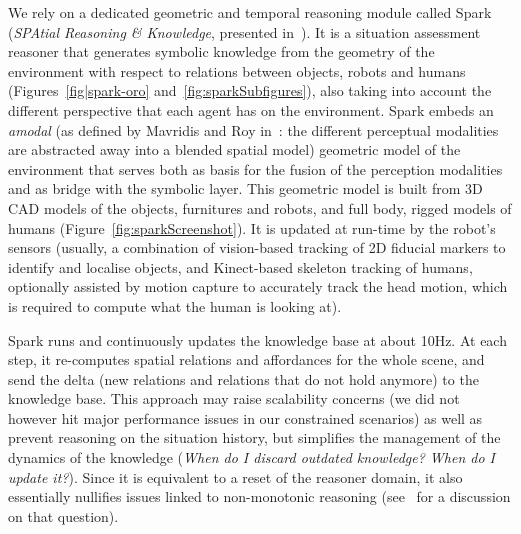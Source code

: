 \documentclass[preprint,3p,times]{elsarticle}
\begin{document}
We rely on a dedicated geometric and temporal reasoning module called {\sc
Spark} (\emph{SPAtial Reasoning \& Knowledge}, presented in~\cite{Sisbot2011}).
It is a situation assessment reasoner that generates symbolic knowledge from the
geometry of the environment with respect to relations between objects, robots
and humans (Figures~\ref{fig|spark-oro} and~\ref{fig:sparkSubfigures}), also
taking into account the different perspective that each agent has on the
environment.  {\sc Spark} embeds an \emph{amodal} (as defined by Mavridis and
Roy in~\cite{Mavridis2006}: the different perceptual modalities are abstracted
away into a blended spatial model) geometric model of the environment that
serves both as basis for the fusion of the perception modalities and as bridge
with the symbolic layer. This geometric model is built from 3D CAD models of the
objects, furnitures and robots, and full body, rigged models of humans
(Figure~\ref{fig:sparkScreenshot}).  It is updated at run-time by the robot's
sensors (usually, a combination of vision-based tracking of 2D fiducial markers
to identify and localise objects, and Kinect-based skeleton tracking of humans,
optionally assisted by motion capture to accurately track the head motion, which
is required to compute what the human is looking at).

{\sc Spark} runs and continuously updates the knowledge base at about 10Hz. At
each step, it re-computes spatial relations and affordances for the whole scene,
and send the delta (new relations and relations that do not hold anymore) to the
knowledge base. This approach may raise scalability concerns (we did not however
hit major performance issues in our constrained scenarios) as well as prevent
reasoning on the situation history, but simplifies the management of the
dynamics of the knowledge (\emph{When do I discard outdated knowledge?  When do
I update it?}). Since it is equivalent to a reset of the reasoner domain, it
also essentially nullifies issues linked to non-monotonic reasoning
(see~\cite{McCarthy2007} for a discussion on that question).
\end{document}
